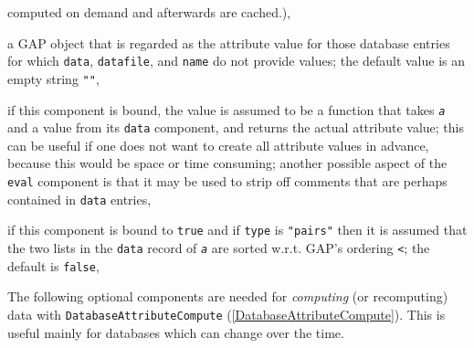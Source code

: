 \documentclass[a4paper,11pt]{report}
\begin{document}
{{{\begin{description}
computed on demand and afterwards are cached.), 
\item[{\texttt{dataDefault}}]  a \textsf{GAP} object that is regarded as the attribute value for those database entries for
which \texttt{data}, \texttt{datafile}, and \texttt{name} do not provide values; the default value is an empty string \texttt{""}, 
\item[{\texttt{eval}}]  if this component is bound, the value is assumed to be a function that takes \mbox{\texttt{\mdseries\slshape a}} and a value from its \texttt{data} component, and returns the actual attribute value; this can be useful if one
does not want to create all attribute values in advance, because this would be
space or time consuming; another possible aspect of the \texttt{eval} component is that it may be used to strip off comments that are perhaps
contained in \texttt{data} entries, 
\item[{\texttt{isSorted}}]  if this component is bound to \texttt{true} and if \texttt{type} is \texttt{"pairs"} then it is assumed that the two lists in the \texttt{data} record of \mbox{\texttt{\mdseries\slshape a}} are sorted w.r.t. \textsf{GAP}'s ordering \texttt{\texttt{}{\textless}}; the default is \texttt{false}, 
\end{description}
 

 The following optional components are needed for \emph{computing} (or recomputing) data with \texttt{DatabaseAttributeCompute} (\ref{DatabaseAttributeCompute}). This is useful mainly for databases which can change over the time. 

}}}
\end{document}
